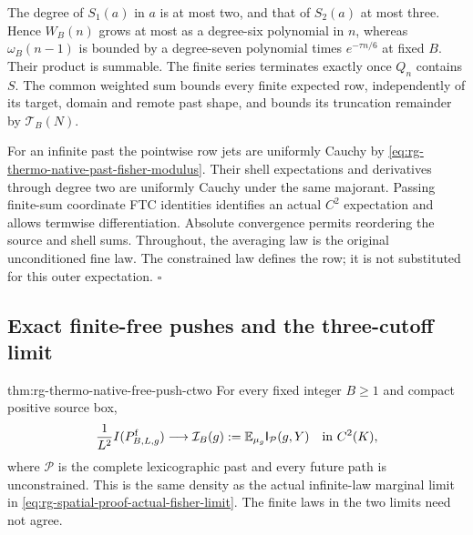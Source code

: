 The degree of \(S_1(a)\) in \(a\) is at most two, and that of
\(S_2(a)\) at most three. Hence \(W_B(n)\) grows at most as a degree-six
polynomial in \(n\), whereas \(\omega_B(n-1)\) is bounded by a degree-seven
polynomial times \(e^{-\tau n/6}\) at fixed \(B\). Their product is
summable. The finite series terminates exactly once \(Q_n\) contains
\(S\). The common weighted sum bounds every finite expected row,
independently of its target, domain and remote past shape, and bounds its
truncation remainder by \(\mathcal T_B(N)\).

For an infinite past the pointwise row jets are uniformly Cauchy by
\cref{eq:rg-thermo-native-past-fisher-modulus}. Their shell expectations
and derivatives through degree two are uniformly Cauchy under the same
majorant. Passing finite-sum coordinate FTC identities identifies an
actual \(C^2\) expectation and allows termwise differentiation. Absolute
convergence permits reordering the source and shell sums. Throughout,
the averaging law is the original unconditioned fine law. The constrained
law defines the row; it is not substituted for this outer expectation.
\hfill\(\square\)

\subsection{Exact finite-free pushes and the three-cutoff limit}
\label{sec:rg-thermo-native-free-push}

{thm:rg-thermo-native-free-push-ctwo}
For every fixed integer \(B\ge1\) and compact positive source box,
\begin{equation}
 \frac1{L^2}I(P^{\mathrm f}_{B,L,g})
 \longrightarrow\mathcal I_B(g):=
          \mathbb E_{\mu_g}\mathsf I_{\mathcal P}(g,Y)
 \quad\text{in }C^2(K),
 \label{eq:rg-thermo-native-free-push-limit}
\end{equation}
where \(\mathcal P\) is the complete lexicographic past and every future
path is unconstrained. This is the same density as the actual
infinite-law marginal limit in
\cref{eq:rg-spatial-proof-actual-fisher-limit}. The finite laws in the two
limits need not agree.\thermoestablishedstatus



